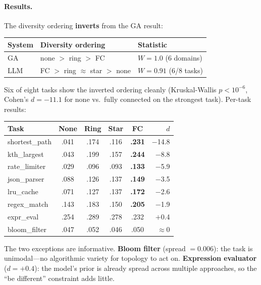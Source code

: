 \documentclass[10pt,twocolumn]{article}
\begin{document}
\paragraph{Results.}
The diversity ordering \textbf{inverts} from the GA result:

\begin{center}
\small
\begin{tabular}{@{}llp{3.6cm}@{}}
\toprule
\textbf{System} & \textbf{Diversity ordering} & \textbf{Statistic} \\
\midrule
GA & none $>$ ring $>$ FC & $W = 1.0$ (6 domains) \\
LLM & FC $>$ ring $\approx$ star $>$ none & $W = 0.91$ (6/8 tasks) \\
\bottomrule
\end{tabular}
\end{center}

\noindent
Six of eight tasks show the inverted ordering cleanly (Kruskal-Wallis
$p < 10^{-6}$, Cohen's $d = -11.1$ for none vs.\ fully connected on
the strongest task). Per-task results:

\begin{center}
\footnotesize
\begin{tabular}{@{}lccccr@{}}
\toprule
\textbf{Task} & \textbf{None} & \textbf{Ring} & \textbf{Star} & \textbf{FC} & $d$ \\
\midrule
shortest\_path & .041 & .174 & .116 & \textbf{.231} & $-$14.8 \\
kth\_largest & .043 & .199 & .157 & \textbf{.244} & $-$8.8 \\
rate\_limiter & .029 & .096 & .093 & \textbf{.133} & $-$5.9 \\
json\_parser & .088 & .126 & .137 & \textbf{.149} & $-$3.5 \\
lru\_cache & .071 & .127 & .137 & \textbf{.172} & $-$2.6 \\
regex\_match & .143 & .183 & .150 & \textbf{.205} & $-$1.9 \\
\midrule
expr\_eval & .254 & .289 & .278 & .232 & $+$0.4 \\
bloom\_filter & .047 & .052 & .046 & .050 & $\approx$0 \\
\bottomrule
\end{tabular}
\end{center}

\noindent
The two exceptions are informative. \textbf{Bloom filter} (spread
$= 0.006$): the task is unimodal---no algorithmic variety for
topology to act on. \textbf{Expression evaluator} ($d = +0.4$):
the model's prior is already spread across multiple approaches, so
the ``be different'' constraint adds little.
\end{document}
